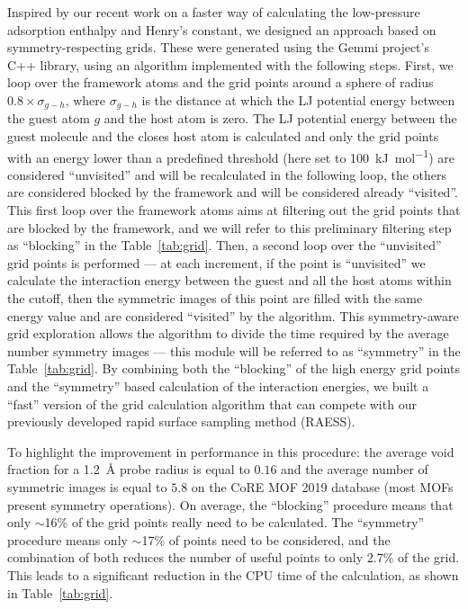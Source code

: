 \documentclass[main]{subfiles}
\begin{document}
Inspired by our recent work on a faster way of calculating the low-pressure adsorption enthalpy and Henry's constant,\cite{Ren_2023} we designed an approach based on symmetry-respecting grids. These were generated using the Gemmi project's C++ library,\cite{Wojdyr_2022} using an algorithm implemented with the following steps. First, we loop over the framework atoms and the grid points around a sphere of radius $0.8\times\sigma_{g-h}$, where $\sigma_{g-h}$ is the distance at which the LJ potential energy between the guest atom $g$ and the host atom is zero. The LJ potential energy between the guest molecule and the closes host atom is calculated and only the grid points with an energy lower than a predefined threshold (here set to \SI{100}{\kilo\joule\per\mole}) are considered ``unvisited'' and will be recalculated in the following loop, the others are considered blocked by the framework and will be considered already ``visited''. This first loop over the framework atoms aims at filtering out the grid points that are blocked by the framework, and we will refer to this preliminary filtering step as ``blocking'' in the Table~\ref{tab:grid}. Then, a second loop over the ``unvisited'' grid points is performed --- at each increment, if the point is ``unvisited'' we calculate the interaction energy between the guest and all the host atoms within the cutoff, then the symmetric images of this point are filled with the same energy value and are considered ``visited'' by the algorithm. This symmetry-aware grid exploration allows the algorithm to divide the time required by the average number symmetry images --- this module will be referred to as ``symmetry'' in the Table~\ref{tab:grid}. By combining both the ``blocking'' of the high energy grid points and the ``symmetry'' based calculation of the interaction energies, we built a ``fast'' version of the grid calculation algorithm that can compete with our previously developed rapid surface sampling method (RAESS).

To highlight the improvement in performance in this procedure: the average void fraction for a \SI{1.2}{\angstrom} probe radius is equal to $0.16$ and the average number of symmetric images is equal to $5.8$ on the CoRE MOF 2019 database (most MOFs present symmetry operations). On average, the ``blocking'' procedure means that only {$\sim$16\%} of the grid points really need to be calculated. The ``symmetry'' procedure means only {$\sim$17\%} of points need to be considered, and the combination of both reduces the number of useful points to only {2.7\%} of the grid. This leads to a significant reduction in the CPU time of the calculation, as shown in Table~\ref{tab:grid}.
\end{document}

